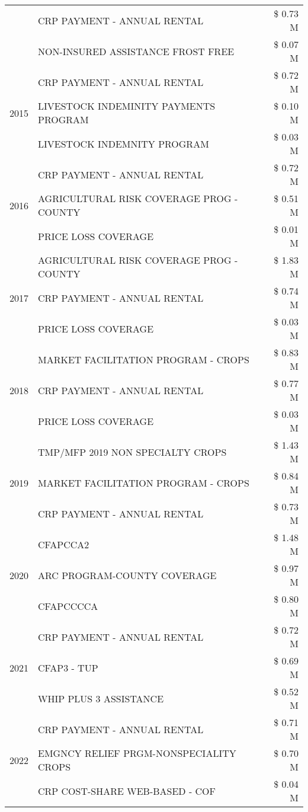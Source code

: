 \begin{tabular}{llr}
 & CRP PAYMENT - ANNUAL RENTAL & \$ 0.73 M \\
 & NON-INSURED ASSISTANCE FROST FREE & \$ 0.07 M \\
\cline{1-3}
\multirow[t]{3}{*}{2015} & CRP PAYMENT - ANNUAL RENTAL & \$ 0.72 M \\
 & LIVESTOCK INDEMINITY PAYMENTS PROGRAM & \$ 0.10 M \\
 & LIVESTOCK INDEMNITY PROGRAM & \$ 0.03 M \\
\cline{1-3}
\multirow[t]{3}{*}{2016} & CRP PAYMENT - ANNUAL RENTAL & \$ 0.72 M \\
 & AGRICULTURAL RISK COVERAGE PROG - COUNTY & \$ 0.51 M \\
 & PRICE LOSS COVERAGE & \$ 0.01 M \\
\cline{1-3}
\multirow[t]{3}{*}{2017} & AGRICULTURAL RISK COVERAGE PROG - COUNTY & \$ 1.83 M \\
 & CRP PAYMENT - ANNUAL RENTAL & \$ 0.74 M \\
 & PRICE LOSS COVERAGE & \$ 0.03 M \\
\cline{1-3}
\multirow[t]{3}{*}{2018} & MARKET FACILITATION PROGRAM - CROPS & \$ 0.83 M \\
 & CRP PAYMENT - ANNUAL RENTAL & \$ 0.77 M \\
 & PRICE LOSS COVERAGE & \$ 0.03 M \\
\cline{1-3}
\multirow[t]{3}{*}{2019} & TMP/MFP 2019 NON SPECIALTY CROPS & \$ 1.43 M \\
 & MARKET FACILITATION PROGRAM - CROPS & \$ 0.84 M \\
 & CRP PAYMENT - ANNUAL RENTAL & \$ 0.73 M \\
\cline{1-3}
\multirow[t]{3}{*}{2020} & CFAPCCA2 & \$ 1.48 M \\
 & ARC PROGRAM-COUNTY COVERAGE & \$ 0.97 M \\
 & CFAPCCCCA & \$ 0.80 M \\
\cline{1-3}
\multirow[t]{3}{*}{2021} & CRP PAYMENT - ANNUAL RENTAL & \$ 0.72 M \\
 & CFAP3 - TUP & \$ 0.69 M \\
 & WHIP PLUS 3 ASSISTANCE & \$ 0.52 M \\
\cline{1-3}
\multirow[t]{3}{*}{2022} & CRP PAYMENT - ANNUAL RENTAL & \$ 0.71 M \\
 & EMGNCY RELIEF PRGM-NONSPECIALITY CROPS & \$ 0.70 M \\
 & CRP COST-SHARE WEB-BASED - COF & \$ 0.04 M \\
\cline{1-3}
\bottomrule
\end{tabular}
